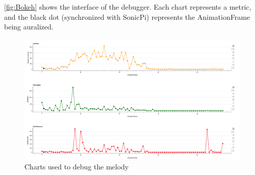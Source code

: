 \autoref{fig:Bokeh} shows the interface of the debugger. Each chart represents a metric, and the black dot (synchronized with SonicPi) represents the AnimationFrame being auralized. 


\begin{figure}
    \center
    \includegraphics[width=\textwidth]{Bokeh.png}
    \caption{Charts used to debug the melody}
    \label{fig:Bokeh}
\end{figure}

